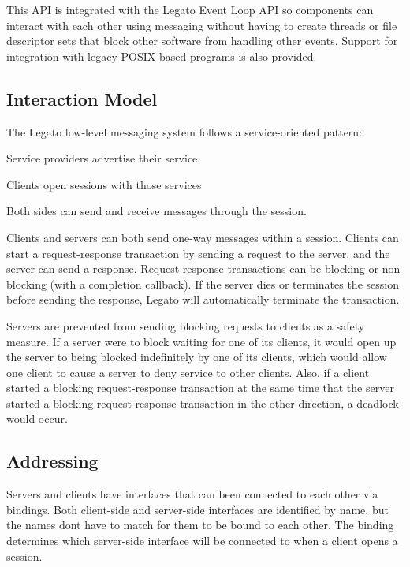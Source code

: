 This A\+P\+I is integrated with the Legato Event Loop A\+P\+I so components can interact with each other using messaging without having to create threads or file descriptor sets that block other software from handling other events. Support for integration with legacy P\+O\+S\+I\+X-\/based programs is also provided.\hypertarget{c_messaging_c_messagingInteractionModel}{}\subsection{Interaction Model}\label{c_messaging_c_messagingInteractionModel}
The Legato low-\/level messaging system follows a service-\/oriented pattern\+:
\begin{DoxyItemize}
\item Service providers advertise their service.
\item Clients open sessions with those services
\item Both sides can send and receive messages through the session.
\end{DoxyItemize}

Clients and servers can both send one-\/way messages within a session. Clients can start a request-\/response transaction by sending a request to the server, and the server can send a response. Request-\/response transactions can be blocking or non-\/blocking (with a completion callback). If the server dies or terminates the session before sending the response, Legato will automatically terminate the transaction.

Servers are prevented from sending blocking requests to clients as a safety measure. If a server were to block waiting for one of its clients, it would open up the server to being blocked indefinitely by one of its clients, which would allow one client to cause a server to deny service to other clients. Also, if a client started a blocking request-\/response transaction at the same time that the server started a blocking request-\/response transaction in the other direction, a deadlock would occur.\hypertarget{c_messaging_c_messagingAddressing}{}\subsection{Addressing}\label{c_messaging_c_messagingAddressing}
Servers and clients have interfaces that can been connected to each other via bindings. Both client-\/side and server-\/side interfaces are identified by name, but the names don\textquotesingle{}t have to match for them to be bound to each other. The binding determines which server-\/side interface will be connected to when a client opens a session.

